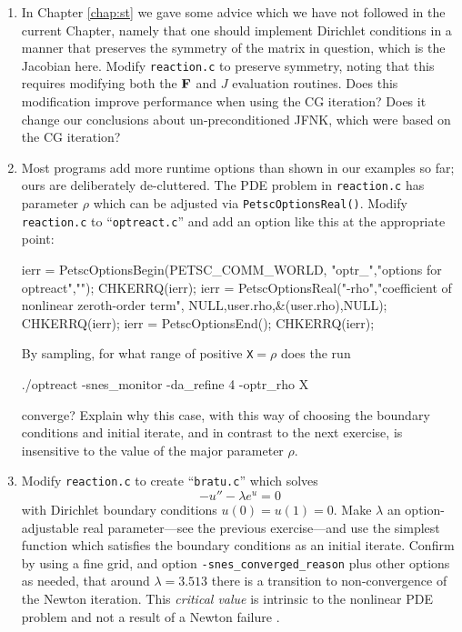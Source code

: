 \begin{enumerate}
\item \label{exer:nl:symmetrizeJ}  In Chapter \ref{chap:st} we gave some advice which we have not followed in the current Chapter, namely that one should implement Dirichlet conditions in a manner that preserves the symmetry of the matrix in question, which is the Jacobian here.  Modify \texttt{reaction.c} to preserve symmetry, noting that this requires modifying both the $\mathbf{F}$ and $J$ evaluation routines.  Does this modification improve performance when using the CG iteration?  Does it change our conclusions about un-preconditioned JFNK, which were based on the CG iteration?

\item Most \PETSc programs add more runtime options than shown in our examples so far; ours are deliberately de-cluttered.  The PDE problem in \texttt{reaction.c} has parameter $\rho$ which can be adjusted via \texttt{PetscOptionsReal()}.  Modify \texttt{reaction.c} to ``\texttt{optreact.c}'' and add an option like this at the appropriate point:
\begin{code}
  ierr = PetscOptionsBegin(PETSC_COMM_WORLD,
                           "optr_","options for optreact",""); CHKERRQ(ierr);
  ierr = PetscOptionsReal("-rho","coefficient of nonlinear zeroth-order term",
                          NULL,user.rho,&(user.rho),NULL); CHKERRQ(ierr);
  ierr = PetscOptionsEnd(); CHKERRQ(ierr);
\end{code}
By sampling, for what range of positive \texttt{X}$=\rho$ does the run
\begin{cline}
./optreact -snes_monitor -da_refine 4 -optr_rho X
\end{cline}
converge?  Explain why this case, with this way of choosing the boundary conditions and initial iterate, and in contrast to the next exercise, is insensitive to the value of the major parameter $\rho$.

\item \label{exer:nl:bratu} Modify \texttt{reaction.c} to create ``\texttt{bratu.c}'' which solves
\begin{equation}
    - u'' - \lambda e^u = 0 \label{eq:nl:bratuoned}
\end{equation}
with Dirichlet boundary conditions $u(0)=u(1)=0$.  Make $\lambda$ an option-adjustable real parameter---see the previous exercise---and use the simplest function which satisfies the boundary conditions as an initial iterate.  Confirm by using a fine grid, and option \texttt{-snes\_converged\_reason} plus other options as needed, that around $\lambda=3.513$ there is a transition to non-convergence of the Newton iteration.  This \emph{critical value} is intrinsic to the nonlinear PDE problem and not a result of a Newton failure \citep{Doedeletal1991}.


\end{enumerate}
